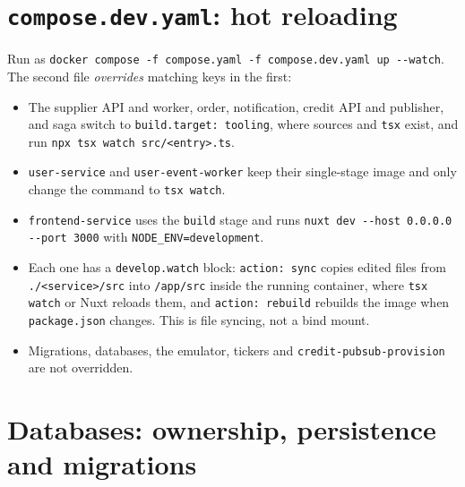 \documentclass[11pt,a4paper]{article}
\newcommand{\code}[1]{\nolinkurl{#1}}
\begin{document}
\section{\texttt{compose.dev.yaml}: hot reloading}
\label{sec:dev}

Run as \code{docker compose -f compose.yaml -f compose.dev.yaml up --watch}. The second
file \emph{overrides} matching keys in the first:
\begin{itemize}
  \item The supplier API and worker, order, notification, credit API and publisher, and
  saga switch to \code{build.target: tooling}, where sources and \code{tsx} exist, and
  run \code{npx tsx watch src/<entry>.ts}.
  \item \code{user-service} and \code{user-event-worker} keep their single-stage image
  and only change the command to \code{tsx watch}.
  \item \code{frontend-service} uses the \code{build} stage and runs
  \code{nuxt dev --host 0.0.0.0 --port 3000} with \code{NODE_ENV=development}.
  \item Each one has a \code{develop.watch} block: \code{action: sync} copies edited
  files from \code{./<service>/src} into \code{/app/src} inside the running container,
  where \code{tsx watch} or Nuxt reloads them, and \code{action: rebuild} rebuilds the
  image when \code{package.json} changes. This is file syncing, not a bind mount.
  \item Migrations, databases, the emulator, tickers and \code{credit-pubsub-provision}
  are not overridden.
\end{itemize}

\section{Databases: ownership, persistence and migrations}
\label{sec:dbs}
\end{document}
